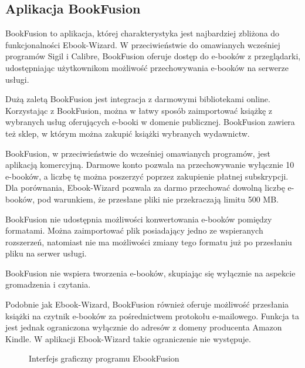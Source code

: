\subsection{Aplikacja BookFusion}

BookFusion to aplikacja, której charakterystyka jest najbardziej zbliżona do funkcjonalności Ebook-Wizard. W przeciwieństwie do omawianych wcześniej programów Sigil i Calibre, BookFusion oferuje dostęp do e-booków z przeglądarki, udostępniając użytkownikom możliwość przechowywania e-booków na serwerze usługi. \cite{bookfusion_general_help_huide}

Dużą zaletą BookFusion jest integracja z darmowymi bibliotekami online. Korzystając z BookFusion, można w łatwy sposób zaimportować książkę z wybranych usług oferujących e-booki w domenie publicznej. BookFusion zawiera też sklep, w którym można zakupić książki wybranych wydawnictw.

BookFusion, w przeciwieństwie do wcześniej omawianych programów, jest aplikacją komercyjną. Darmowe konto pozwala na przechowywanie wyłącznie 10 e-booków, a liczbę tę można poszerzyć poprzez zakupienie płatnej subskrypcji. Dla porównania, Ebook-Wizard pozwala za darmo przechować dowolną liczbę e-booków, pod warunkiem, że przesłane pliki nie przekraczają limitu 500 MB. 

BookFusion nie udostępnia możliwości konwertowania e-booków pomiędzy formatami. Można zaimportować plik posiadający jedno ze wspieranych rozszerzeń, natomiast nie ma możliwości zmiany tego formatu już po przesłaniu pliku na serwer usługi.

BookFusion nie wspiera tworzenia e-booków, skupiając się wyłącznie na aspekcie gromadzenia i czytania. 

Podobnie jak Ebook-Wizard, BookFusion również oferuje możliwość przesłania książki na czytnik e-booków za pośrednictwem protokołu e-mailowego. Funkcja ta jest jednak ograniczona wyłącznie do adresów z domeny producenta Amazon Kindle. W aplikacji Ebook-Wizard takie ograniczenie nie występuje.

\begin{figure}[h]
    \centering
    \setlength{\fboxsep}{0pt}
    \setlength{\fboxrule}{0.4pt}
    \caption{Interfejs graficzny programu EbookFusion}
    \label{fig:obrazek_z_ramką}
\end{figure}

